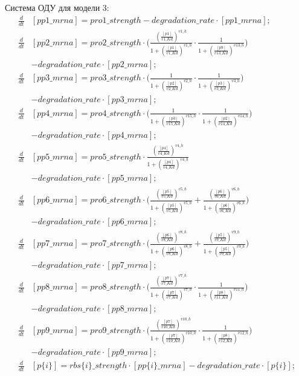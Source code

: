 Система ОДУ для модели 3:
\[ \begin{aligned}
  \frac{d}{dt}&[pp1\_mrna] = pro1\_strength - degradation\_rate \cdot [pp1\_mrna]; \\
  \frac{d}{dt}&[pp2\_mrna] = pro2\_strength \cdot 
    \biggl(\frac{(\frac{[p1]}{v1\_Kd})^{v1\_h}}{1+(\frac{[p1]}{v1\_Kd})^{v1\_h}} 
    \cdot \frac{1}{1+(\frac{[p9]}{v13\_Kd})^{v13\_h}}\biggr) \\
    & - degradation\_rate \cdot [pp2\_mrna]; \\
  \frac{d}{dt}&[pp3\_mrna] = pro3\_strength \cdot 
    \biggl(\frac{1}{1+(\frac{[p2]}{v2\_Kd})^{v2\_h}} 
    \cdot \frac{1}{1+(\frac{[p3]}{v3\_Kd})^{v3\_h}}\biggr) \\
    & - degradation\_rate \cdot [pp3\_mrna]; \\
  \frac{d}{dt}&[pp4\_mrna] = pro4\_strength \cdot 
    \biggl(\frac{1}{1+(\frac{[p3]}{v15\_Kd})^{v15\_h}} 
    \cdot \frac{1}{1+(\frac{[p2]}{v14\_Kd})^{v14\_h}}\biggr) \\
    & - degradation\_rate \cdot [pp4\_mrna]; \\
  \frac{d}{dt}&[pp5\_mrna] = pro5\_strength 
    \cdot \frac{(\frac{[p4]}{v4\_Kd})^{v4\_h}}{1+(\frac{[p4]}{v4\_Kd})^{v4\_h}} \\
    & - degradation\_rate \cdot [pp5\_mrna]; \\
  \frac{d}{dt}&[pp6\_mrna] = pro6\_strength \cdot 
    \biggl(\frac{(\frac{[p5]}{v5\_Kd})^{v5\_h}}{1+(\frac{[p5]}{v5\_Kd})^{v5\_h}} + 
    \frac{(\frac{[p6]}{v6\_Kd})^{v6\_h}}{1+(\frac{[p6]}{v6\_Kd})^{v6\_h}}\biggr) \\
    & - degradation\_rate \cdot [pp6\_mrna]; \\
  \frac{d}{dt}&[pp7\_mrna] = pro7\_strength \cdot 
    \biggl(\frac{(\frac{[p6]}{v8\_Kd})^{v8\_h}}{1+(\frac{[p6]}{v8\_Kd})^{v8\_h}} + 
    \frac{(\frac{[p5]}{v9\_Kd})^{v9\_h}}{1+(\frac{[p5]}{v9\_Kd})^{v9\_h}}\biggr) \\
    & - degradation\_rate \cdot [pp7\_mrna]; \\
  \frac{d}{dt}&[pp8\_mrna] = pro8\_strength \cdot 
    \biggl(\frac{(\frac{[p7]}{v7\_Kd})^{v7\_h}}{1+(\frac{[p7]}{v7\_Kd})^{v7\_h}} 
    \cdot \frac{1}{1+(\frac{[p8]}{v11\_Kd})^{v11\_h}}\biggr) \\
    & - degradation\_rate \cdot [pp8\_mrna]; \\
  \frac{d}{dt}&[pp9\_mrna] = pro9\_strength \cdot 
    \biggl(\frac{(\frac{[p7]}{v10\_Kd})^{v10\_h}}{1+(\frac{[p7]}{v10\_Kd})^{v10\_h}} 
    \cdot \frac{1}{1+(\frac{[p8]}{v12\_Kd})^{v12\_h}}\biggr) \\
    & - degradation\_rate \cdot [pp9\_mrna]; \\
  \frac{d}{dt}&[p\{i\}] = rbs\{i\}\_strength \cdot [pp\{i\}\_mrna] - degradation\_rate \cdot [p\{i\}]; \\
\end{aligned} \]

